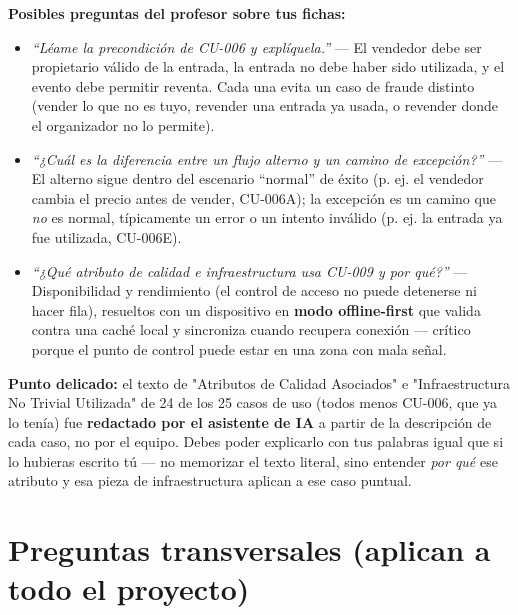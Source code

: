 \documentclass[12pt,a4paper]{article}
\begin{document}
\begin{pregunta}
\textbf{Posibles preguntas del profesor sobre tus fichas:}
\begin{itemize}
\item \textit{``Léame la precondición de CU-006 y explíquela.''} --- El vendedor debe ser
propietario válido de la entrada, la entrada no debe haber sido utilizada, y el evento debe
permitir reventa. Cada una evita un caso de fraude distinto (vender lo que no es tuyo, revender una
entrada ya usada, o revender donde el organizador no lo permite).
\item \textit{``¿Cuál es la diferencia entre un flujo alterno y un camino de excepción?''} --- El
alterno sigue dentro del escenario ``normal'' de éxito (p. ej. el vendedor cambia el precio antes de
vender, CU-006A); la excepción es un camino que \emph{no} es normal, típicamente un error o un
intento inválido (p. ej. la entrada ya fue utilizada, CU-006E).
\item \textit{``¿Qué atributo de calidad e infraestructura usa CU-009 y por qué?''} --- Disponibilidad
y rendimiento (el control de acceso no puede detenerse ni hacer fila), resueltos con un dispositivo
en \textbf{modo offline-first} que valida contra una caché local y sincroniza cuando recupera
conexión --- crítico porque el punto de control puede estar en una zona con mala señal.
\end{itemize}
\end{pregunta}

\begin{alerta}
\textbf{Punto delicado:} el texto de "Atributos de Calidad Asociados" e "Infraestructura No Trivial
Utilizada" de 24 de los 25 casos de uso (todos menos CU-006, que ya lo tenía) fue \textbf{redactado
por el asistente de IA} a partir de la descripción de cada caso, no por el equipo. Debes poder
explicarlo con tus palabras igual que si lo hubieras escrito tú --- no memorizar el texto literal,
sino entender \emph{por qué} ese atributo y esa pieza de infraestructura aplican a ese caso
puntual.
\end{alerta}

\section{Preguntas transversales (aplican a todo el proyecto)}
\end{document}
